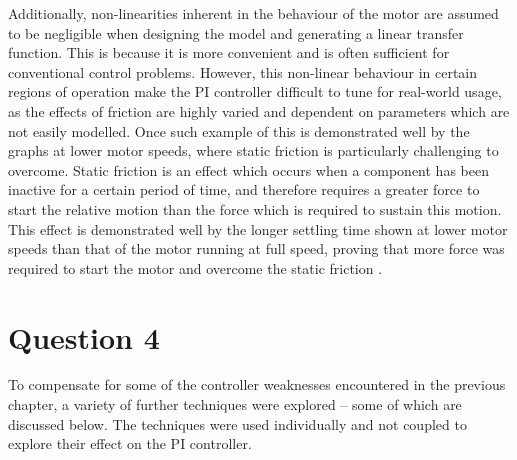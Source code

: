 \documentclass[11pt, onecolumn]{article}
\begin{document}
\par Additionally, non-linearities inherent in the behaviour of the motor are assumed to be negligible when designing the model and generating a linear transfer function. This is because it is more convenient and is often sufficient for conventional control problems. However, this non-linear behaviour in certain regions of operation make the PI controller difficult to tune for real-world usage, as the effects of friction are highly varied and dependent on parameters which are not easily modelled. Once such example of this is demonstrated well by the graphs at lower motor speeds, where static friction is particularly challenging to overcome. Static friction is an effect which occurs when a component has been inactive for a certain period of time, and therefore requires a greater force to start the relative motion than the force which is required to sustain this motion. This effect is demonstrated well by the longer settling time shown at lower motor speeds than that of the motor running at full speed, proving that more force was required to start the motor and overcome the static friction \cite{ijsrpStudyNonlinear}.
\section*{Question 4}
\par To compensate for some of the controller weaknesses encountered in the previous chapter, a variety of further techniques were explored – some of which are discussed below. The techniques were used individually and not coupled to explore their effect on the PI controller.
\end{document}
